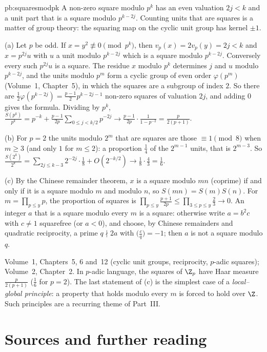 \begin{solution}{pb:squaresmodpk}
\idea A non-zero square modulo $p^k$ has an even valuation $2j<k$ and a unit part that is a square modulo $p^{k-2j}$. Counting
units that are squares is a matter of group theory: the squaring map on the cyclic unit group has kernel $\pm1$.

\writeup (a) Let $p$ be odd. If $x=y^2\not\equiv0\pmod{p^k}$, then $v_p(x)=2v_p(y)=2j<k$ and $x=p^{2j}u$ with $u$ a unit modulo $p^{k-2j}$ which is a
square modulo $p^{k-2j}$. Conversely every such $p^{2j}u$ is a square. The residue $x$ modulo $p^k$ determines $j$ and $u$ modulo $p^{k-2j}$,
and the units modulo $p^m$ form a cyclic group of even order $\varphi(p^m)$ (Volume~1, Chapter~5), in which the squares are a subgroup of
index $2$. So there are $\frac12\varphi(p^{k-2j})=\frac{p-1}2p^{k-2j-1}$ non-zero squares of valuation $2j$, and adding $0$ gives the formula.
Dividing by $p^k$, $\frac{S(p^k)}{p^k}=p^{-k}+\frac{p-1}{2p}\sum_{0\le j<k/2}p^{-2j}\to\frac{p-1}{2p}\cdot\frac1{1-p^{-2}}=\frac p{2(p+1)}$.

(b) For $p=2$ the units modulo $2^m$ that are squares are those $\equiv1\pmod8$ when $m\ge3$ (and only $1$ for $m\le2$): a proportion
$\frac14$ of the $2^{m-1}$ units, that is $2^{m-3}$. So $\frac{S(2^k)}{2^k}=\sum_{2j\le k-3}2^{-2j}\cdot\frac18+O(2^{-k/2})\to\frac18\cdot\frac43=\frac16$.

(c) By the Chinese remainder theorem, $x$ is a square modulo $mn$ (coprime) if and only if it is a square modulo $m$ and modulo $n$,
so $S(mn)=S(m)S(n)$. For $m=\prod_{p\le y}p$, the proportion of squares is $\prod_{p\le y}\frac{p+1}{2p}\le\prod_{3\le p\le y}\frac23\to0$. An
integer $a$ that is a square modulo every $m$ is a square: otherwise write $a=b^2c$ with $c\ne1$ squarefree (or $a<0$), and choose,
by Chinese remainders and quadratic reciprocity, a prime $q\nmid2a$ with $\bigl(\frac cq\bigr)=-1$; then $a$ is not a square modulo $q$.

\tools Volume~1, Chapters~5, 6 and~12 (cyclic unit groups, reciprocity, $p$-adic squares); Volume~2, Chapter~2.
\leads In $p$-adic language, the squares of $\Z_p$ have Haar measure $\frac p{2(p+1)}$ ($\frac16$ for $p=2$). The last statement of (c)
is the simplest case of a \emph{local--global principle}: a property that holds modulo every $m$ is forced
to hold over $\Z$. Such principles are a recurring theme of Part~III.
\end{solution}

\section*{Sources and further reading}

